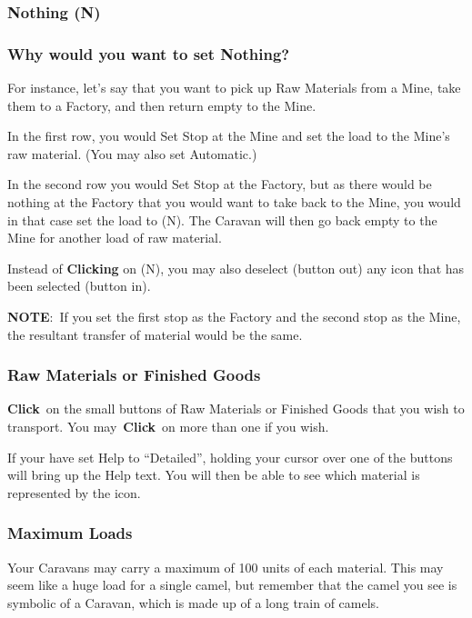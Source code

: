 \subsubsection{Nothing (N)}

\subsubsection{Why would you want to set Nothing?}

For instance, let’s say that you want to pick up Raw Materials from a Mine, take them to a Factory, and then return empty to the Mine.

\begin{adjustwidth}{1cm}{}
In the first row, you would Set Stop at the Mine and set the load to the Mine’s raw material. (You may also set Automatic.)

In the second row you would Set Stop at the Factory, but as there would be nothing at the Factory that you would want to take back to the Mine, you would in that case set the load to (N). The Caravan will then go back empty to the Mine for another load of raw material.

Instead of \textbf{Clicking} on (N), you may also deselect (button out) any icon that has been selected (button in).
\end{adjustwidth}

\textbf{NOTE}: If you set the first stop as the Factory and the second stop as the Mine, the resultant transfer of material would be the same.

\subsubsection{Raw Materials or Finished Goods}

\textbf{Click} on the small buttons of Raw Materials or Finished Goods that you wish to transport. You may \textbf{Click} on more than one if you wish.

If your have set Help to “Detailed”, holding your cursor over one of the buttons will bring up the Help text. You will then be able to see which material is represented by the icon.

\subsubsection{Maximum Loads}

Your Caravans may carry a maximum of 100 units of each material. This may seem like a huge load for a single camel, but remember that the camel you see is symbolic of a Caravan, which is made up of a long train of camels.

